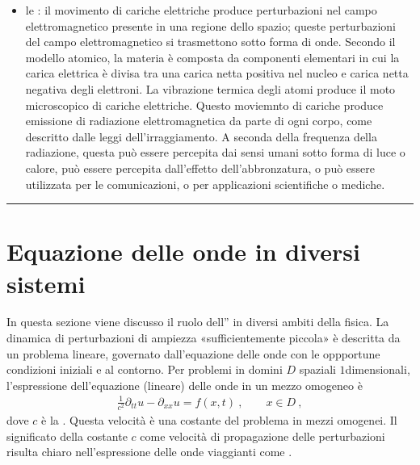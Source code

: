 \documentclass[letterpaper,10pt,italian]{jupyterBook}
\begin{document}
\begin{itemize}
\begin{itemize}
\end{itemize}

\item {} 
\sphinxAtStartPar
le {\hyperref[\detokenize{ch/electromagnetism/em-waves:physics-hs-electromagnetism-em-waves}]{}}: il movimento di cariche elettriche produce perturbazioni nel campo elettromagnetico presente in una regione dello spazio; queste perturbazioni del campo elettromagnetico si trasmettono sotto forma di onde. Secondo il modello atomico, la materia è composta da componenti elementari in cui la carica elettrica è divisa tra una carica netta positiva nel nucleo e carica netta negativa degli elettroni. La vibrazione termica degli atomi produce il moto microscopico di cariche elettriche. Questo moviemnto di cariche produce emissione di radiazione elettromagnetica da parte di ogni corpo, come descritto dalle leggi dell’irraggiamento. A seconda della frequenza della radiazione, questa può essere percepita dai sensi umani sotto forma di luce o calore, può essere percepita dall’effetto dell’abbronzatura, o può essere utilizzata per le comunicazioni, o per applicazioni scientifiche o mediche.

\end{itemize}






\bigskip\hrule\bigskip


\sphinxstepscope


\section{Equazione delle onde in diversi sistemi}
\label{\detokenize{ch/waves/waves-in-physics:equazione-delle-onde-in-diversi-sistemi}}\label{\detokenize{ch/waves/waves-in-physics:physics-hs-waves-equation-examples}}\label{\detokenize{ch/waves/waves-in-physics::doc}}
\sphinxAtStartPar
In questa sezione viene discusso il ruolo dell” in diversi ambiti della fisica. La dinamica di perturbazioni di ampiezza «sufficientemente piccola» è descritta da un problema lineare, governato dall’equazione delle onde con le oppportune condizioni iniziali e al contorno. Per problemi in domini \(D\) spaziali \(1\)\sphinxhyphen{}dimensionali, l’espressione dell’equazione (lineare) delle onde in un mezzo omogeneo è
\begin{equation}\label{equation:ch/waves/waves-in-physics:eq:wave-eqn:1d}
\begin{split}\frac{1}{c^2} \partial_{tt} u - \partial_{xx} u = f(x, t) \ , \qquad x \in D \ ,\end{split}
\end{equation}
\sphinxAtStartPar
dove \(c\) è la . Questa velocità è una costante del problema in mezzi omogenei. Il significato della costante \(c\) come velocità di propagazione delle perturbazioni risulta chiaro nell’espressione delle onde viaggianti come {\hyperref[\detokenize{ch/waves/phenomena:physics-hs-waves-equation-solutions}]{}}.
\end{document}
